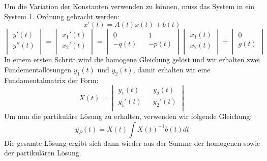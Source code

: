Um die Variation der Konstanten verwenden zu  können, muss das System in ein System 1. Ordnung gebracht werden:\\
\begin{equation*}
x'(t) = A(t)x(t) + b(t)
\end{equation*}
\begin{equation*}
	\begin{vmatrix} 
	        y'(t)\\ 
	        y''(t)\\   
	\end{vmatrix}
	=
	\begin{vmatrix} 
	        x_1'(t)\\ 
	        x_2'(t)\\   
	\end{vmatrix}
	=
	\begin{vmatrix} 
	        0 && 1\\ 
	       -q(t) && -p(t)\\   
	\end{vmatrix}
	\begin{vmatrix} 
	        x_1(t)\\ 
	        x_2(t)\\   
	\end{vmatrix}
	+
	\begin{vmatrix} 
	        0\\ 
	        g(t)\\   
	\end{vmatrix}
\end{equation*}
In einem ersten Schritt wird die homogene Gleichung gelöst und wir erhalten zwei Fundementallösungen $y_1(t)$ und $y_2(t)$, damit erhalten wir eine Fundamentalmatrix der Form: \\
\begin{equation*}
X(t) = 
	\begin{vmatrix} 
	        y_1(t) && y_2(t)\\ 
	        y_1'(t) && y_2'(t)\\ 
	\end{vmatrix}
\end{equation*}
Um nun die partikuläre Lösung zu erhalten, verwenden wir folgende Gleichung: 
\begin{equation*}
y_P(t) = X(t) \int{X(t)^{-1}b(t)dt}
\end{equation*}
Die gesamte Lösung ergibt sich dann wieder aus der Summe der homogenen sowie der partikulären Lösung. 

